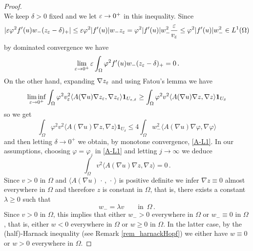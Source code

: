 \documentclass[10 pt,a4paper]{article}
\theoremstyle{definition}
\begin{document}
\begin{proof}
\[	\]
	We keep $\delta>0$ fixed and we let $\varepsilon\to0^+$ in this inequality. Since
	\[
	|\varepsilon\varphi^2 f'(u)w_-(z_\varepsilon-\delta)_+| \leq \varepsilon \varphi^2 |f'(u)| w_- z_\varepsilon = \varphi^2 |f'(u)| w_-^2 \frac{\varepsilon}{v_\varepsilon} \leq \varphi^2 |f'(u)| w_-^2 \in L^1(\Omega)
	\]
	by dominated convergence we have
	\[
	\lim_{\varepsilon\to0^+} \varepsilon \int_\Omega \varphi^2 f'(u)w_-(z_\varepsilon -\delta)_+ = 0 \, .
	\]
	On the other hand, expanding $\nabla z_\varepsilon$ and using Fatou's lemma we have
	\[
	\liminf_{\varepsilon\to0^+} \int_\Omega \varphi^2 v_\varepsilon^2 \langle A(\nabla u) \nabla z_\varepsilon, \nabla z_\varepsilon \rangle \mathbf{1}_{U_{\varepsilon,\delta}} \geq \int_{\Omega} \varphi^2 v^2 \langle A(\nabla u) \nabla z, \nabla z \rangle \mathbf{1}_{U_\delta}
	\]
	so we get
	\[
	\int_\Omega \varphi^2 v^2 \langle A(\nabla u) \nabla z, \nabla z \rangle \mathbf{1}_{U_\delta} \le 4 \int_\Omega w_-^2 \langle A(\nabla u) \nabla \varphi, \nabla \varphi \rangle
	\]
	and then letting $\delta\to0^+$ we obtain, by monotone convergence, \eqref{A-L1}. In our assumptions, choosing $\varphi = \varphi_j$ in \eqref{A-L1} and letting $j \to \infty$ we deduce
%	
	\[
	\int_\Omega v^2 \langle A(\nabla u)\nabla z,\nabla z\rangle = 0 \, .
	\]
	Since $v>0$ in $\Omega$ and $\langle A(\nabla u)\,\cdot\,,\,\cdot\,\rangle$ is positive definite we infer $\nabla z\equiv0$ almost everywhere in $\Omega$ and therefore $z$ is constant in $\Omega$, that is, there exists a constant $\lambda\geq0$ such that
	\[
		w_- = \lambda v \qquad \text{in } \, \Omega \, .
	\]
	Since $v>0$ in $\Omega$, this implies that either $w_->0$ everywhere in $\Omega$ or $w_- \equiv 0$ in $\Omega$, that is, either $w<0$ everywhere in $\Omega$ or $w\geq 0$ in $\Omega$. In the latter case, by the (half)-Harnack inequality (see Remark \ref{rem_harnackHopf}) we either have $w\equiv 0$ or $w>0$ everywhere in $\Omega$.
\end{proof}
\end{document}
